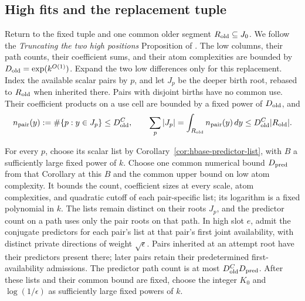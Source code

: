 \subsection{High fits and the replacement tuple}

Return to the fixed tuple and one common older segment
\(R_{\rm old}\subseteq J_0\).  We follow the
\emph{Truncating the two high positions} Proposition of
\cite[Section~5]{H}.  The low columns, their path counts, their
coefficient sums, and their atom complexities are bounded by
\(D_{\rm old}=\exp(k^{O(1)})\).  Expand the two low differences
only for this replacement.  Index the available scalar pairs by
\(p\), and let \(J_p\) be the deeper birth root, rebased to
\(R_{\rm old}\) when inherited there.  Pairs with disjoint births
have no common use.  Their coefficient products on a use cell
are bounded by a fixed power of \(D_{\rm old}\), and
\begin{equation}
 n_{\rm pair}(y):=\#\{p:y\in J_p\}\le D_{\rm old}^C,\qquad
 \sum_p|J_p|=\int_{R_{\rm old}}n_{\rm pair}(y)\,dy
       \le D_{\rm old}^C|R_{\rm old}|.                         \label{eq:hbase-low-packing}
\end{equation}

For every \(p\), choose its scalar list by
Corollary~\ref{cor:hbase-predictor-list}, with \(B\) a sufficiently
large fixed power of \(k\).  Choose one common numerical bound
\(D_{\rm pred}\) from that Corollary at this \(B\) and the common upper
bound on low atom complexity.  It bounds the count, coefficient sizes
at every scale, atom complexities, and quadratic cutoff of each
pair-specific list; its logarithm is a fixed polynomial in \(k\).
The lists remain distinct on their roots \(J_p\), and the predictor
count on a path uses only the pair roots on that path.  In high slot
\(e\), admit the conjugate predictors for each pair's list at that pair's
first joint availability, with distinct private directions of weight
\(\sqrt\epsilon\).  Pairs inherited at an attempt root have their
predictors present there; later pairs retain their predetermined
first-availability admissions.  The predictor path count is at most
\(D_{\rm old}^C D_{\rm pred}\).  After these lists and their common bound
are fixed, choose the integer \(K_0\) and \(\log(1/\epsilon)\) as
sufficiently large fixed powers of \(k\).


